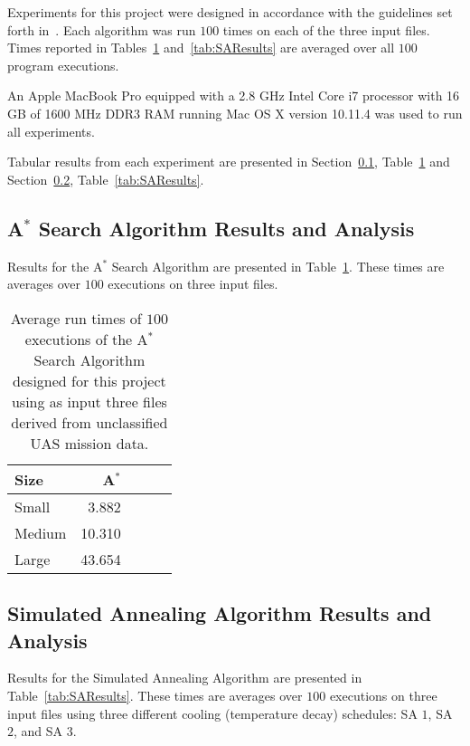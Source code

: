 \documentclass[conference]{IEEEtran}
\begin{document}
Experiments for this project were designed in accordance with the guidelines
set forth in~\cite{barr2001}. Each algorithm was run $100$ times on each of the
three input files. Times reported in Tables~\ref{tab:astarResults}
and~\ref{tab:SAResults} are averaged over all $100$ program executions.

An Apple MacBook Pro equipped with a 2.8 GHz Intel Core i7 processor with 16 GB
of 1600 MHz DDR3 RAM running Mac OS X version 10.11.4 was used to run all
experiments.
 
Tabular results from each experiment are presented in
Section~\ref{sec:astarResults}, Table~\ref{tab:astarResults} and
Section~\ref{sec:SAResults}, Table~\ref{tab:SAResults}.

\subsection{A$^*$ Search Algorithm Results and Analysis} \label{sec:astarResults}

Results for the A$^*$ Search Algorithm are presented in
Table~\ref{tab:astarResults}. These times are averages over $100$ executions on
three input files.

\begin{table}[ht!]
  \centering
  \caption{Average run times of $100$ executions of the A$^*$ Search Algorithm
  designed for this project using as input three files derived from
  unclassified UAS mission data.}
  \label{tab:astarResults}
  \begin{tabular}{ | l | r | r | r | r | }
  \hline
    Size     &  A$^*$ \\ \hline\hline
    Small    &  3.882 \\ \hline
    Medium   & 10.310 \\ \hline
    Large    & 43.654 \\ \hline
  \end{tabular}
\end{table}

\subsection{Simulated Annealing Algorithm Results and Analysis} \label{sec:SAResults}
 
Results for the Simulated Annealing Algorithm are presented in
Table~\ref{tab:SAResults}. These times are averages over $100$ executions on
three input files using three different cooling (temperature decay) schedules:
SA $1$, SA $2$, and SA $3$.
\end{document}
